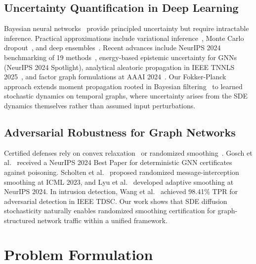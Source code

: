 \documentclass[journal]{IEEEtran}
\begin{document}
\subsection{Uncertainty Quantification in Deep Learning}

Bayesian neural networks~\cite{mackay1992bayesian} provide principled uncertainty but require intractable inference. Practical approximations include variational inference~\cite{kingma2014auto}, Monte Carlo dropout~\cite{gal2016dropout}, and deep ensembles~\cite{lakshminarayanan2017simple}. Recent advances include NeurIPS 2024 benchmarking of 19 methods~\cite{mucsanyi2024benchmarking}, energy-based epistemic uncertainty for GNNs~\cite{fuchsgruber2024energy} (NeurIPS 2024 Spotlight), analytical aleatoric propagation in IEEE TNNLS 2025~\cite{jungmann2025analytical}, and factor graph formulations at AAAI 2024~\cite{titensky2024factor}. Our Fokker-Planck approach extends moment propagation rooted in Bayesian filtering~\cite{sarkka2013bayesian} to learned stochastic dynamics on temporal graphs, where uncertainty arises from the SDE dynamics themselves rather than assumed input perturbations.

\subsection{Adversarial Robustness for Graph Networks}

Certified defenses rely on convex relaxation~\cite{wong2018provable} or randomized smoothing~\cite{cohen2019certified}. Gosch et al.~\cite{gosch2024provable} received a NeurIPS 2024 Best Paper for deterministic GNN certificates against poisoning. Scholten et al.~\cite{scholten2023randomized} proposed randomized message-interception smoothing at ICML 2023, and Lyu et al.~\cite{lyu2024adaptive} developed adaptive smoothing at NeurIPS 2024. In intrusion detection, Wang et al.~\cite{wang2023manda} achieved 98.41\% TPR for adversarial detection in IEEE TDSC. Our work shows that SDE diffusion stochasticity naturally enables randomized smoothing certification for graph-structured network traffic within a unified framework.


\section{Problem Formulation}
\label{sec:problem}
\end{document}
